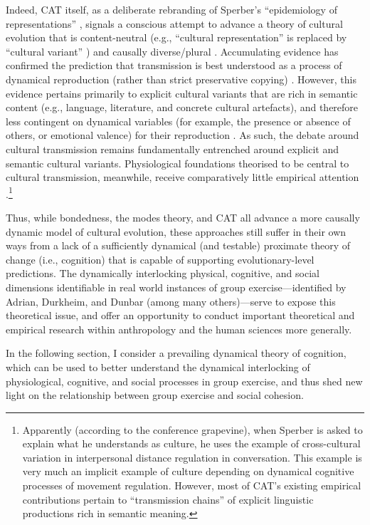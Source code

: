 \begin{CJK}{UTF8}{gbsn}
Indeed, CAT itself, as a deliberate rebranding of Sperber's ``epidemiology of representations'' \citep{Sperber1996}, signals a conscious attempt to advance a theory of cultural evolution that is content-neutral (e.g., ``cultural representation'' is replaced by ``cultural variant'' \citep{Scott-Phillips2018}) and causally diverse/plural \citep{Claidiere2014}.  Accumulating evidence has confirmed the prediction that transmission is best understood as a process of dynamical reproduction (rather than strict preservative copying) \citep[e.g.,][]{Morin2016,Scott-Phillips2017a}.  However, this evidence  pertains primarily to explicit cultural variants that are rich in semantic content (e.g., language, literature, and concrete cultural artefacts), and therefore less contingent on dynamical variables (for example, the presence or absence of others, or emotional valence) for their reproduction \citep[15]{Ramstead2016}.
As such, the debate around cultural transmission remains fundamentally entrenched around explicit and semantic cultural variants. Physiological foundations theorised to be central to cultural transmission, meanwhile, receive comparatively little empirical attention \citep{Ramstead2016,Lerique2016}.\footnote{Apparently (according to the conference grapevine), when Sperber is asked to explain what he understands as culture, he uses the example of cross-cultural variation in interpersonal distance regulation in conversation.  This example is very much an implicit example of culture depending on dynamical cognitive processes of movement regulation.  However, most of CAT's existing empirical contributions pertain to ``transmission chains'' of explicit linguistic productions rich in semantic meaning.}

Thus, while bondedness, the modes theory, and CAT all advance a more causally dynamic model of cultural evolution, these approaches still suffer in their own ways from a lack of a sufficiently dynamical (and testable) proximate theory of change (i.e., cognition) that is capable of supporting evolutionary-level predictions.  The dynamically interlocking physical, cognitive, and social dimensions identifiable in real world instances of group exercise---identified by Adrian, Durkheim, and Dunbar (among many others)---serve to expose this theoretical issue, and offer an opportunity to conduct important theoretical and empirical research within anthropology and the human sciences more generally.

In the following section, I consider a prevailing dynamical theory of cognition, which can be used to better understand the dynamical interlocking of physiological, cognitive, and social processes in group exercise, and thus shed new light on the relationship between group exercise and social cohesion.


\end{CJK}
